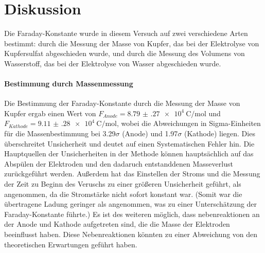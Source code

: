 \documentclass[12pt,a4paper,titlepage]{scrartcl}
\numberwithin{equation}{section}
\numberwithin{table}{section}
\numberwithin{figure}{section}
\begin{document}
\section{Diskussion}

Die Faraday-Konstante wurde in diesem Versuch auf zwei verschiedene Arten bestimmt: durch die Messung der Masse von Kupfer, das bei der Elektrolyse von Kupfersulfat abgeschieden wurde, und durch die Messung des Volumens von Wasserstoff, das bei der Elektrolyse von Wasser abgeschieden wurde.

\paragraph{Bestimmung durch Massenmessung}
Die Bestimmung der Faraday-Konstante durch die Messung der Masse von Kupfer ergab einen Wert von $F_{Anode} = \qty{8.79(27)e4}{\coulomb\per\mol}$ und $F_{Kathode} = \qty{9.11(28)e4}{\coulomb\per\mol}$, wobei die Abweichungen in Sigma-Einheiten für die Massenbestimmung bei 3.29$\sigma$ (Anode) und 1.97$\sigma$ (Kathode) liegen. Dies überschreitet Unsicherheit und deutet auf einen Systematischen Fehler hin. Die Hauptquellen der Unsicherheiten in der Methode können hauptsächlich auf das Abspülen der Elektroden und den dadaruch entstanddenen Masseverlust zurückgeführt werden. Außerdem hat das Einstellen der Stroms und die Messung der Zeit zu Beginn des Veruschs zu einer größeren Unsicherheit geführt, als angenommen, da die Stromstärke nicht sofort konstant war. (Somit war die übertragene Ladung geringer als angenommen, was zu einer Unterschätzung der Faraday-Konstante führte.) Es ist des weiteren möglich, dass nebenreaktionen an der Anode und Kathode aufgetreten sind, die die Masse der Elektroden beeinflusst haben. Diese Nebenreaktionen könnten zu einer Abweichung von den theoretischen Erwartungen geführt haben.
\end{document}
